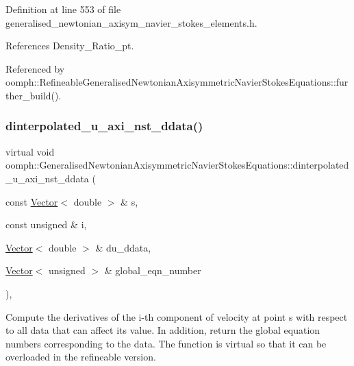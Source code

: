 Definition at line 553 of file generalised\+\_\+newtonian\+\_\+axisym\+\_\+navier\+\_\+stokes\+\_\+elements.\+h.



References Density\+\_\+\+Ratio\+\_\+pt.



Referenced by oomph\+::\+Refineable\+Generalised\+Newtonian\+Axisymmetric\+Navier\+Stokes\+Equations\+::further\+\_\+build().

\mbox{\label{classoomph_1_1GeneralisedNewtonianAxisymmetricNavierStokesEquations_a115dec50e9fc5d82449a327d420c9790}} 
\subsubsection{\texorpdfstring{dinterpolated\+\_\+u\+\_\+axi\+\_\+nst\+\_\+ddata()}{dinterpolated\_u\_axi\_nst\_ddata()}}
{\footnotesize\ttfamily virtual void oomph\+::\+Generalised\+Newtonian\+Axisymmetric\+Navier\+Stokes\+Equations\+::dinterpolated\+\_\+u\+\_\+axi\+\_\+nst\+\_\+ddata (\begin{DoxyParamCaption}\item[{const \hyperlink{classoomph_1_1Vector}{Vector}$<$ double $>$ \&}]{s,  }\item[{const unsigned \&}]{i,  }\item[{\hyperlink{classoomph_1_1Vector}{Vector}$<$ double $>$ \&}]{du\+\_\+ddata,  }\item[{\hyperlink{classoomph_1_1Vector}{Vector}$<$ unsigned $>$ \&}]{global\+\_\+eqn\+\_\+number }\end{DoxyParamCaption})\hspace{0.3cm}{\ttfamily [inline]}, {\ttfamily [virtual]}}



Compute the derivatives of the i-\/th component of velocity at point s with respect to all data that can affect its value. In addition, return the global equation numbers corresponding to the data. The function is virtual so that it can be overloaded in the refineable version. 



